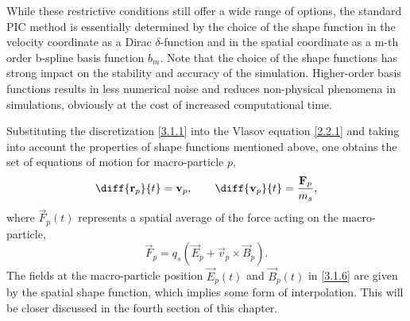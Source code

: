 While these restrictive conditions still offer a wide range of options, the standard PIC method is essentially determined by the choice of the shape function in the velocity coordinate as a Dirac $ \delta $-function and in the spatial coordinate as a m-th order b-spline basis function $ b_{m} $.
Note that the choice of the shape functions has strong impact on the stability and accuracy of the simulation. Higher-order basis functions results in less numerical noise and reduces non-physical phenomena in simulations, obviously at the cost of increased computational time.

Substituting the discretization \ref{3.1.1} into the Vlasov equation \ref{2.2.1} and taking into account the properties of shape functions mentioned above, one obtains the set of equations of motion for macro-particle $ p $,
\begin{equation}
\label{3.1.5}
\diff{\vec{r}_{p}}{t} = \vec{v}_{p}, \qquad \diff{\vec{v}_{p}}{t} = \frac{\vec{F}_p}{m_s},
\end{equation}
where $ \vec{F}_p \left( t\right) $ represents a spatial average of the force acting on the macro-particle,
\begin{equation}
\label{3.1.6}
\vec{F}_p = q_s \left(\vec{E}_p + \vec{v}_p \times \vec{B}_p \right).
\end{equation}
The fields at the macro-particle position $ \vec{E}_p \left( t\right) $ and $ \vec{B}_p \left( t\right) $ in \ref{3.1.6} are given by the spatial shape function, which implies some form of interpolation. This will be closer discussed in the fourth section of this chapter.

